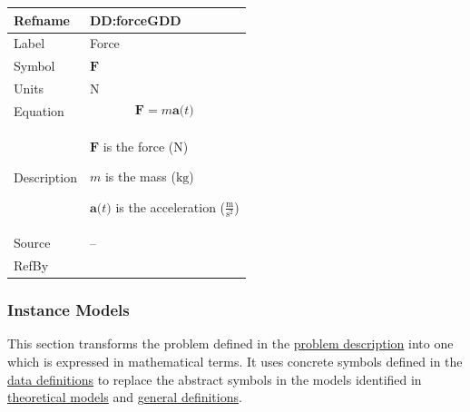 \documentclass[12pt]{article}
\begin{document}
\vspace{\baselineskip}
\noindent
\begin{minipage}{\textwidth}
\begin{tabular}{>{\raggedright}p{}>{\raggedright\arraybackslash}p{}}
\toprule \textbf{Refname} & \textbf{DD:forceGDD}
\label{DD:forceGDD}
\\ \midrule
Label & Force
        
\\ \midrule
Symbol & $\symbf{F}$
         
\\ \midrule
Units & ${\text{N}}$
        
\\ \midrule
Equation & \begin{displaymath}
           \symbf{F}=m \symbf{a}\text{(}t\text{)}
           \end{displaymath}
\\ \midrule
Description & \begin{symbDescription}
              \item{$\symbf{F}$ is the force (${\text{N}}$)}
              \item{$m$ is the mass (${\text{kg}}$)}
              \item{$\symbf{a}\text{(}t\text{)}$ is the acceleration ($\frac{\text{m}}{\text{s}^{2}}$)}
              \end{symbDescription}
\\ \midrule
Source & --
         
\\ \midrule
RefBy & 
\\ \bottomrule
\end{tabular}
\end{minipage}

\subsubsection{Instance Models}
\label{Sec:IMs}
This section transforms the problem defined in the \hyperref[Sec:ProbDesc]{problem description} into one which is expressed in mathematical terms. It uses concrete symbols defined in the \hyperref[Sec:DDs]{data definitions} to replace the abstract symbols in the models identified in \hyperref[Sec:TMs]{theoretical models} and \hyperref[Sec:GDs]{general definitions}.
\end{document}
